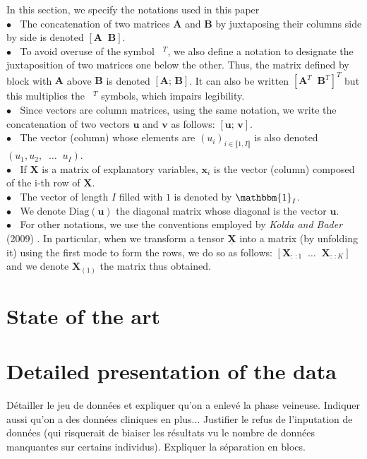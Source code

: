 \documentclass[10pt]{article}
\begin{document}
In this section, we specify the notations used in this paper \\[5 pt]
\noindent $\bullet \; \;$ The concatenation of two matrices $\mathbf{A}$ and $\mathbf{B}$ by juxtaposing their columns side by side is denoted $[\mathbf{A} \; \; \mathbf{B}]$.\\
$\bullet \; \;$ To avoid overuse of the symbol $\phantom{a}^T$, we also define a notation to designate the juxtaposition of two matrices one below the other. Thus, the matrix defined by block with $\mathbf{A}$ above $\mathbf{B}$ is denoted $\left[\mathbf{A}; \, \mathbf{B}\right]$. It can also be written $[\mathbf{A}^T \; \; \mathbf{B}^T]^T$ but this multiplies the $\phantom{a}^T$ symbols, which impairs legibility. \\
$\bullet \; \;$ Since vectors are column matrices, using the same notation, we write the concatenation of two vectors $\mathbf{u}$ and $\mathbf{v}$ as follows: $[\mathbf{u}; \, \mathbf{v}]$.  \\
$\bullet \; \;$ The vector (column) whose elements are $(u_i)_{i \in \llbracket 1, I\rrbracket}$ is also denoted $(u_1, u_2, \; \; \hdots \;\; u_I)$. \\
$\bullet \; \;$ If $\mathbf{X}$ is a matrix of explanatory variables, $\mathbf{x}_i$ is the vector (column) composed of the i-th row of $\mathbf{X}$.\\
$\bullet \; \;$ The vector of length $I$ filled with $1$ is denoted by $\mathbbm{1}_I$.\\
$\bullet \; \;$ We denote $\text{Diag}(\mathbf{u})$ the diagonal matrix whose diagonal is the vector $\mathbf{u}$. \\
$\bullet \; \;$ For other notations, we use the conventions employed by \textit{Kolda and Bader} (2009) \cite{conventions}. In particular, when we transform a tensor $\underline{\mathbf{X}}$ into a matrix (by unfolding it) using the first mode to form the rows, we do so as follows: $[\mathbf{X}_{:\,:1} \; \; \ldots \; \;\mathbf{X}_{:\,:K}]$ and we denote $\mathbf{X}_{(1)}$ the matrix thus obtained.

\section{State of the art}
\blindtext

\section{Detailed presentation of the data}
Détailler le jeu de données et expliquer qu'on a enlevé la phase veineuse. Indiquer aussi qu'on a des données cliniques en plus... Justifier le refus de l'inputation de données (qui risquerait de biaiser les résultats vu le nombre de données manquantes sur certains individus). Expliquer la séparation en blocs.
\end{document}
